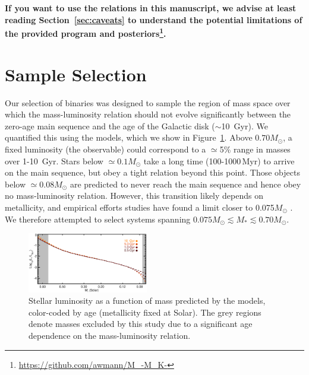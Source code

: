 \documentclass[twocolumn]{aastex62}
\begin{document}
 {\bf If you want to use the relations in this manuscript, we advise at least reading Section~\ref{sec:caveats} to understand the potential limitations of the provided program and posteriors\footnote{\href{https://github.com/awmann/M_-M_K-}{https://github.com/awmann/M\_-M\_K-}}.}%


\section{Sample Selection}\label{sec:targets}
Our selection of binaries was designed to sample the region of mass space over which the mass-luminosity relation should not evolve significantly between the zero-age main sequence and the age of the Galactic disk ($\sim$10~Gyr). We quantified this using the \citet{BHAC15} models, which we show in Figure~\ref{fig:age}. Above $0.70M_\odot$, a fixed luminosity (the observable) could correspond to a $\simeq$5\% range in masses over 1-10\, Gyr. Stars below $\simeq0.1M_\odot$ take a long time (100-1000\,Myr) to arrive on the main sequence, but obey a tight relation beyond this point. Those objects below $\simeq0.08M_\odot$ are predicted to never reach the main sequence and hence obey no mass-luminosity relation. However, this transition likely depends on metallicity, and empirical efforts studies have found a limit closer to 0.075$M_\odot$ \citep[e.g.,][]{Dieterich2014,Dupuy2017}. We therefore attempted to select systems spanning $0.075M_\odot \lesssim M_* \lesssim 0.70M_\odot$.

\begin{figure}[htb]
\begin{center}
\includegraphics[width=0.47\textwidth]{Model_age2.eps}
\caption{Stellar luminosity as a function of mass predicted by the \citet{BHAC15} models, color-coded by age (metallicity fixed at Solar). The grey regions denote masses excluded by this study due to a significant age dependence on the mass-luminosity relation.}
\label{fig:age}
\end{center}
\end{figure}
\end{document}
